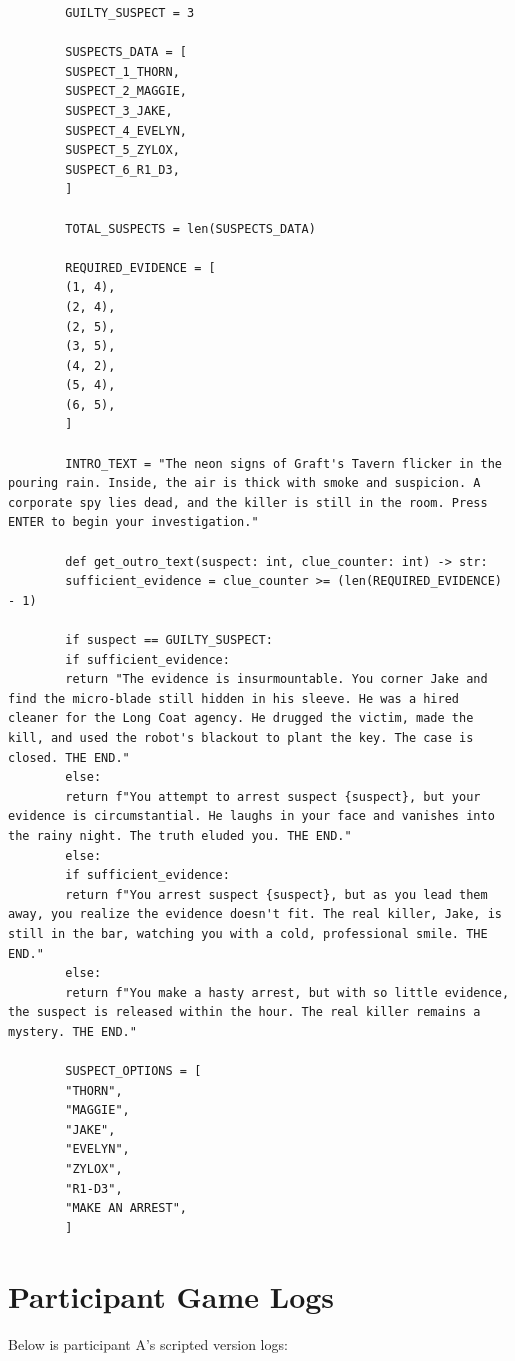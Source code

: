 \documentclass[12pt, a4paper]{report}
\begin{document}
\begin{verbatim}
		GUILTY_SUSPECT = 3
		
		SUSPECTS_DATA = [
		SUSPECT_1_THORN,
		SUSPECT_2_MAGGIE,
		SUSPECT_3_JAKE,
		SUSPECT_4_EVELYN,
		SUSPECT_5_ZYLOX,
		SUSPECT_6_R1_D3,
		]
		
		TOTAL_SUSPECTS = len(SUSPECTS_DATA)
		
		REQUIRED_EVIDENCE = [
		(1, 4),
		(2, 4),
		(2, 5),
		(3, 5),
		(4, 2),
		(5, 4),
		(6, 5),
		]
		
		INTRO_TEXT = "The neon signs of Graft's Tavern flicker in the pouring rain. Inside, the air is thick with smoke and suspicion. A corporate spy lies dead, and the killer is still in the room. Press ENTER to begin your investigation."
		
		def get_outro_text(suspect: int, clue_counter: int) -> str:
		sufficient_evidence = clue_counter >= (len(REQUIRED_EVIDENCE) - 1)
		
		if suspect == GUILTY_SUSPECT:
		if sufficient_evidence:
		return "The evidence is insurmountable. You corner Jake and find the micro-blade still hidden in his sleeve. He was a hired cleaner for the Long Coat agency. He drugged the victim, made the kill, and used the robot's blackout to plant the key. The case is closed. THE END."
		else:
		return f"You attempt to arrest suspect {suspect}, but your evidence is circumstantial. He laughs in your face and vanishes into the rainy night. The truth eluded you. THE END."
		else:
		if sufficient_evidence:
		return f"You arrest suspect {suspect}, but as you lead them away, you realize the evidence doesn't fit. The real killer, Jake, is still in the bar, watching you with a cold, professional smile. THE END."
		else:
		return f"You make a hasty arrest, but with so little evidence, the suspect is released within the hour. The real killer remains a mystery. THE END."
		
		SUSPECT_OPTIONS = [
		"THORN",
		"MAGGIE",
		"JAKE",
		"EVELYN",
		"ZYLOX",
		"R1-D3",
		"MAKE AN ARREST",
		]
	\end{verbatim}
	
	\section{Participant Game Logs}
	\label{section:participantgamelogs}
	Below is participant A's scripted version logs:
	
\end{document}
